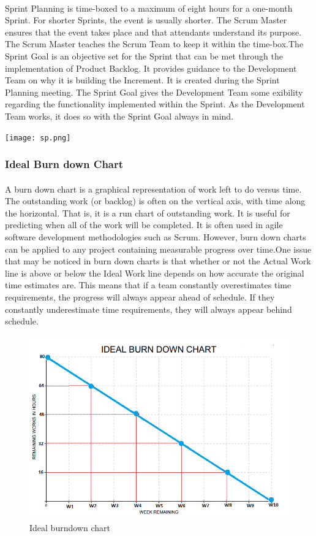 \documentclass[a4paper, 12pt]{report}
\begin{document}
\paragraph{}
Sprint Planning is time-boxed to a maximum of eight hours for a one-month Sprint. For shorter Sprints, the event is usually shorter. The Scrum Master ensures that the event takes place and that attendants understand its purpose. The Scrum Master teaches the Scrum Team to keep it within the time-box.The Sprint Goal is an objective set for the Sprint that can be met through the implementation of Product Backlog. It provides guidance to the Development Team on why it is building the Increment. It is created during the Sprint Planning meeting. The Sprint Goal gives the Development Team some exibility regarding the functionality implemented within the Sprint. As the Development Team works, it does so with the Sprint Goal always in mind.


\texttt{[image: sp.png]} 


\subsubsection{Ideal Burn down Chart}
\fontsize{12pt}{12pt}\selectfont
\paragraph{}
A burn down chart is a graphical representation of work left to do versus time. The outstanding work (or backlog) is often on the vertical axis, with time along the horizontal. That is, it is a run chart of outstanding work. It is useful for predicting when all of the work will be completed. It is often used in agile software development methodologies such as Scrum. However, burn down charts can be applied to any project containing measurable progress over time.One issue that may be noticed in burn down charts is that whether or not the Actual Work line is above or below the Ideal Work line depends on how accurate the original time estimates are. This means that if a team constantly overestimates time requirements, the progress will always appear ahead of schedule. If they constantly underestimate time requirements, they will always appear behind schedule.
\\
\begin{figure}[hbtp]
\includegraphics[width=.9\textwidth]{BURDOWNEDITED.PNG}
\caption{Ideal burndown chart}
\end{figure}
\end{document}
